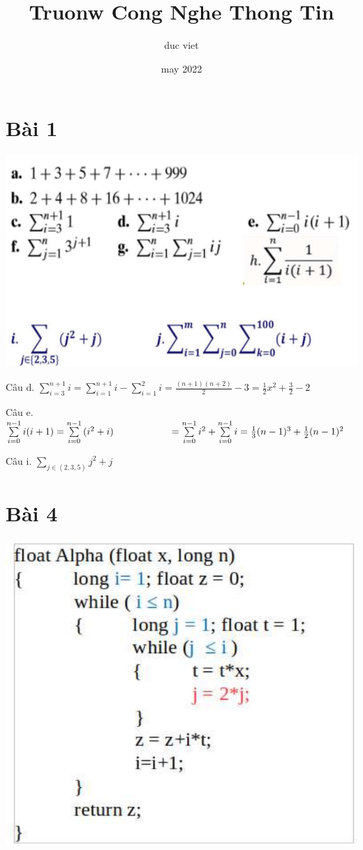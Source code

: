 \documentclass{article}
\title{Truonw Cong Nghe Thong Tin}
\author{duc viet}
\date{may 2022}
\newcommand\tab[1][1cm]{\hspace*{#1}}
\begin{document}
\maketitle

\newpage
\section*{Bài 1}
\includegraphics[scale=0.7]{bai1}


\vspace{5mm}
Câu d. 
\tab \(\sum\limits_{i=3}^{n+1}{i} = \sum\limits_{i=1}^{n+1}{i} - \sum\limits_{i=1}^{2}{i} = \frac{(n+1)(n+2)}{2} - 3 = \frac{1}{2}x^2 + \frac{3}{2} - 2 \)

\vspace{5mm}
Câu e. 
\tab \(\sum\limits_{i=0}^{n-1}{i(i+1)} = \sum\limits_{i=0}^{n-1}{(i^2 + i)}\\
\tab \tab = \sum\limits_{i=0}^{n-1}{i^2} + \sum\limits_{i=0}^{n-1}{i} = \frac{1}{3}(n-1)^3 + \frac{1}{2}(n-1)^2
\)


\vspace{5mm}
Câu i. 
\tab \(\sum\limits_{j\in (2,3,5)}^{ }{j^2 + j} \)

\section*{Bài 4}
\includegraphics[scale=0.5]{bai4}
\end{document}
